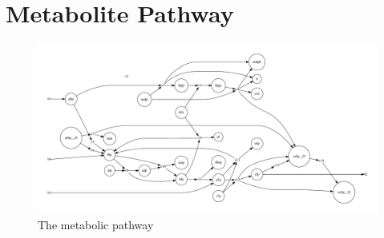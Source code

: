 \documentclass{scrartcl}
\begin{document}
	\section{Metabolite Pathway}
		\begin{figure}[H]
			\centering
			\includegraphics[max height=\linewidth, max width=0.75\paperheight, rotate=-90]{pathway.pdf}
			\caption{The metabolic pathway}
		\end{figure}
\end{document}
